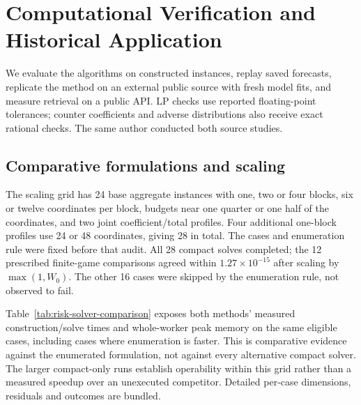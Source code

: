 \section{Computational Verification and Historical Application}
\label{sec:evaluation}
We evaluate the algorithms on constructed instances, replay saved forecasts,
replicate the method on an external public source with fresh model fits,
and measure retrieval on a public API. LP checks use reported floating-point
tolerances; counter coefficients and adverse distributions also receive
exact rational checks. The same author conducted both source studies.

\subsection{Comparative formulations and scaling}
The scaling grid has 24 base aggregate instances with one, two or four
blocks, six or twelve coordinates per block, budgets near one quarter or
one half of the coordinates, and two joint coefficient/total profiles.
Four additional one-block profiles use 24 or 48 coordinates, giving 28 in total. The cases
and enumeration rule were fixed before that audit. All 28 compact solves
completed; the 12 prescribed finite-game comparisons agreed within
$1.27\times10^{-15}$ after scaling by $\max(1,W_0)$. The other 16 cases
were skipped by the enumeration rule, not observed to fail.

Table~\ref{tab:risk-solver-comparison} exposes both methods' measured
construction/solve times and whole-worker peak memory on the same eligible
cases, including cases where enumeration is faster. This is comparative
evidence against the enumerated formulation, not against every alternative
compact solver. The larger compact-only runs establish operability within
this grid rather than a measured speedup over an unexecuted competitor.
Detailed per-case dimensions, residuals and outcomes are bundled.

